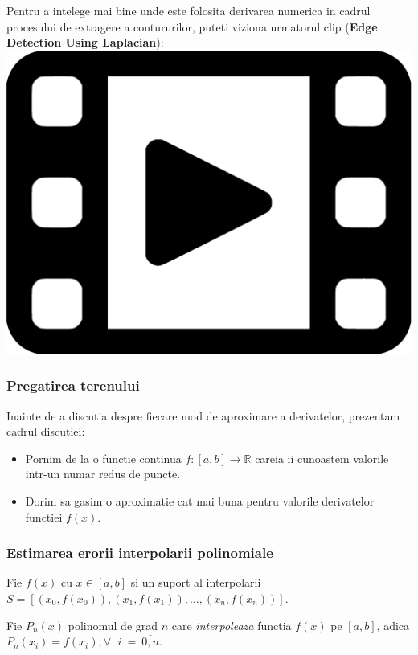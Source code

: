 \documentclass{article}
\begin{document}
\tabto{0.5cm} Pentru a intelege mai bine unde este folosita derivarea numerica in cadrul procesului de extragere a contururilor, puteti viziona urmatorul clip (\textbf{Edge Detection Using Laplacian}): \href{https://www.youtube.com/watch?v=uNP6ZwQ3r6A}{\includegraphics[scale=0.0125]{video_player}} 


\subsubsection{Pregatirea terenului}
\tab Inainte de a discutia despre fiecare mod de aproximare a derivatelor, prezentam cadrul discutiei:

\begin{itemize}
    \item Pornim de la o functie continua $f:[a,b]\rightarrow\mathbb{R}$ careia ii cunoastem valorile intr-un numar redus de puncte.
    \item Dorim sa gasim o aproximatie cat mai buna pentru valorile derivatelor functiei $f(x)$.
\end{itemize}


\subsubsection{Estimarea erorii interpolarii polinomiale}
\label{sec:est_err}
\tab Fie $f(x)$ cu $x \in [a,b]$ si un suport al interpolarii $S=[(x_0, f(x_0)), (x_1, f(x_1)),\dots,(x_n, f(x_n))]$.\vspace{0.1cm}

Fie $P_n(x)$ polinomul de grad $n$ care \textit{interpoleaza} functia $f(x)$ pe $[a,b]$, adica $P_n(x_i) = f(x_i), \forall~\,~i~=~\overline{0, n}$.
\end{document}
